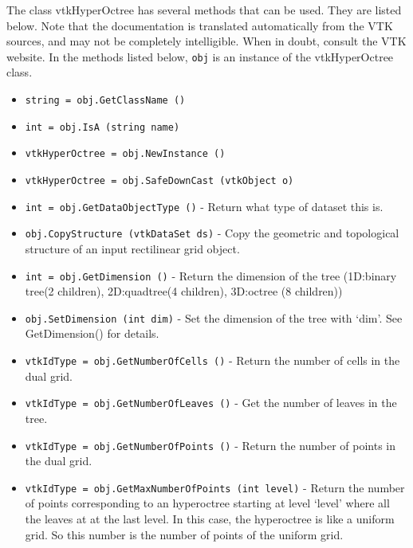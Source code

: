 The class vtkHyperOctree has several methods that can be used.
  They are listed below.
Note that the documentation is translated automatically from the VTK sources,
and may not be completely intelligible.  When in doubt, consult the VTK website.
In the methods listed below, \verb|obj| is an instance of the vtkHyperOctree class.
\begin{itemize}
\item  \verb|string = obj.GetClassName ()|

\item  \verb|int = obj.IsA (string name)|

\item  \verb|vtkHyperOctree = obj.NewInstance ()|

\item  \verb|vtkHyperOctree = obj.SafeDownCast (vtkObject o)|

\item  \verb|int = obj.GetDataObjectType ()| -  Return what type of dataset this is.

\item  \verb|obj.CopyStructure (vtkDataSet ds)| -  Copy the geometric and topological structure of an input rectilinear grid
 object.

\item  \verb|int = obj.GetDimension ()| -  Return the dimension of the tree (1D:binary tree(2 children), 2D:quadtree(4 children),
 3D:octree (8 children))
 

\item  \verb|obj.SetDimension (int dim)| -  Set the dimension of the tree with `dim'. See GetDimension() for details.
 
 

\item  \verb|vtkIdType = obj.GetNumberOfCells ()| -  Return the number of cells in the dual grid.
 

\item  \verb|vtkIdType = obj.GetNumberOfLeaves ()| -  Get the number of leaves in the tree.

\item  \verb|vtkIdType = obj.GetNumberOfPoints ()| -  Return the number of points in the dual grid.
 

\item  \verb|vtkIdType = obj.GetMaxNumberOfPoints (int level)| -  Return the number of points corresponding to an hyperoctree starting at
 level `level' where all the leaves at at the last level. In this case, the
 hyperoctree is like a uniform grid. So this number is the number of points
 of the uniform grid. 
 

\end{itemize}
